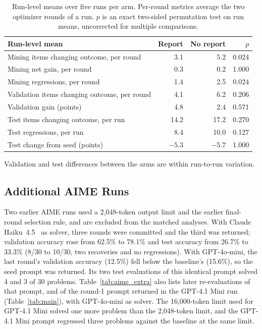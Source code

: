 \documentclass[10pt]{article} %
\begin{document}
\begin{table}[htbp]
\caption{Run-level means over five runs per arm. Per-round metrics average the two optimizer rounds of a run. $p$ is an
exact two-sided permutation test on run means, uncorrected for multiple comparisons.}
\label{tab:ablation_runs}
\begin{center}
\small
\setlength{\tabcolsep}{4pt}
\begin{tabular}{lrrr}
\toprule
\rowcolor{midblue}Run-level mean & Report & No report & $p$ \\
\midrule
Mining items changing outcome, per round & 3.1 & 5.2 & 0.024 \\
Mining net gain, per round & 0.3 & 0.2 & 1.000 \\
Mining regressions, per round & 1.4 & 2.5 & 0.024 \\
Validation items changing outcome, per round & 4.1 & 6.2 & 0.206 \\
Validation gain (points) & 4.8 & 2.4 & 0.571 \\
Test items changing outcome, per run & 14.2 & 17.2 & 0.270 \\
Test regressions, per run & 8.4 & 10.0 & 0.127 \\
Test change from seed (points) & $-5.3$ & $-5.7$ & 1.000 \\
\bottomrule
\end{tabular}
\end{center}
\end{table}

Validation and test differences between the arms are within run-to-run variation.

\FloatBarrier
\subsection{Additional AIME Runs}
\label{app:aime_extra}
Two earlier AIME runs used a 2,048-token output limit and the earlier final-round selection rule, and are excluded
from the matched analyses. With Claude Haiku~4.5~\citep{anthropic2025haiku45} as solver, three rounds were committed and
the third was returned; validation accuracy rose from 62.5\% to 78.1\% and test accuracy from 26.7\% to 33.3\% (8/30 to
10/30, two recoveries and no regressions). With GPT-4o-mini, the last round's validation accuracy (12.5\%) fell below the
baseline's (15.6\%), so the seed prompt was returned. Its two test evaluations of this identical prompt solved 4 and 3 of
30 problems. Table~\ref{tab:aime_extra} also lists later re-evaluations of that prompt, and of the round-1 prompt returned
in the GPT-4.1 Mini run (Table~\ref{tab:main}), with GPT-4o-mini as solver. The 16,000-token limit used for GPT-4.1 Mini
solved one more problem than the 2,048-token limit, and the GPT-4.1 Mini prompt regressed three problems against the
baseline at the same limit.
\end{document}

